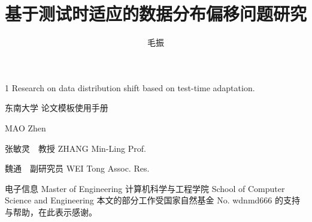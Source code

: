 \documentclass[algorithmlist,figurelist,tablelist,nomlist,engineer]{seumasterthesis}
\begin{document}

\title
    {基于测试时适应的数据分布偏移问题研究}                                      %
    {1}                                          %
    {Research on data distribution shift based on test-time adaptation.}  %
    { }            %

\spine
    {东南大学  论文模板使用手册}      %
    {}                                                          %

\author
    {毛振}                        %
    {MAO Zhen}                 %

\advisor
    {张敏灵~~教授}                       %
    {ZHANG Min-Ling}           %
    {Prof.}                     %

\coadvisor
    {魏通~~副研究员}                        %
    {WEI Tong}               %
    {Assoc. Res.}                     %

\degreetype                     %
    {电子信息}
    {Master of Engineering}
\department                     %
    {计算机科学与工程学院}
    {School of Computer Science and Engineering}
\seuthesisthanks                %
    {本文的部分工作受国家自然基金 No. wdnmd666 的支持与帮助，在此表示感谢。}
\end{document}
